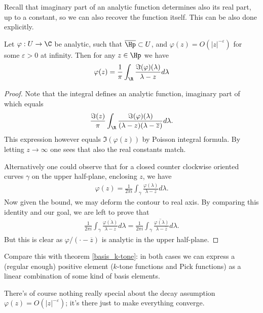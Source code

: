 Recall that imaginary part of an analytic function determines also its real part, up to a constant, so we can also recover the function itself. This can be also done explicitly.

\begin{lause}
	Let $\varphi : U \to \C$ be analytic, such that $\overline{\Hp} \subset U$, and $\varphi(z) = O(|z|^{-\varepsilon})$ for some $\varepsilon > 0$ at infinity. Then for any $z \in \Hp$ we have
	\begin{align*}
		\varphi(z) = \frac{1}{\pi}\int_{\R} \frac{\Im(\varphi)(\lambda)}{\lambda - z} d \lambda
	\end{align*}
\end{lause}
\begin{proof}
	Note that the integral defines an analytic function, imaginary part of which equals
	\begin{align*}
		\frac{\Im(z)}{\pi}\int_{\R} \frac{\Im(\varphi)(\lambda)}{(\lambda - z)(\lambda - \overline{z})} d \lambda.
	\end{align*}
	This expression however equals $\Im(\varphi(z))$ by Poisson integral formula. By letting $z \to \infty$ one sees that also the real constants match.

	Alternatively one could observe that for a closed counter clockwise oriented curves $\gamma$ on the upper half-plane, enclosing $z$, we have
	\begin{align*}
		\varphi(z) = \frac{1}{2\pi i}\int_{\gamma} \frac{\varphi(\lambda)}{\lambda - z} d \lambda.
	\end{align*}
	Now given the bound, we may deform the contour to real axis. By comparing this identity and our goal, we are left to prove that
	\begin{align*}
		\frac{1}{2\pi i}\int_{\gamma} \frac{\overline{\varphi(\lambda)}}{\lambda - z} d \lambda = \frac{1}{2\pi i} \overline{\int_{\gamma} \frac{\varphi(\lambda)}{\lambda - \overline{z}} d \lambda}.
	\end{align*}
	But this is clear as $\varphi/(\cdot - \overline{z})$ is analytic in the upper half-plane.
\end{proof}

Compare this with theorem \ref{basis_k-tone}: in both cases we can express a (regular enough) positive element ($k$-tone functions and Pick functions) as a linear combination of some kind of basis elements.

There's of course nothing really special about the decay assumption $\varphi(z) = O(|z|^{-\varepsilon})$; it's there just to make everything converge.

